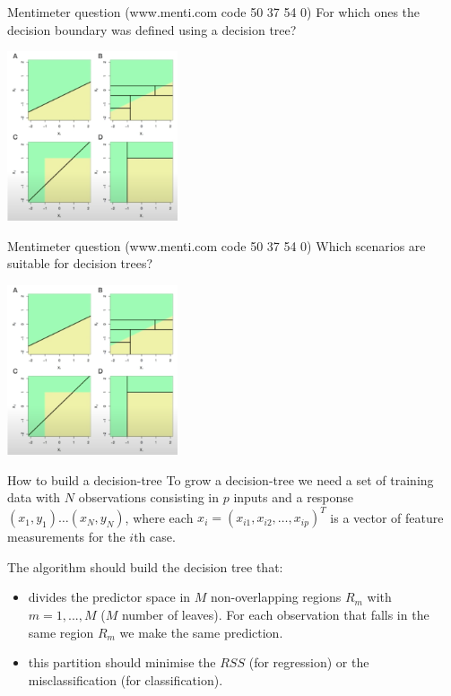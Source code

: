 \documentclass[notes]{beamer}          %
\begin{document}
\begin{frame}{Mentimeter question (www.menti.com code 50 37 54 0)}
For which ones the decision boundary was defined using a decision tree?
\begin{center}
\includegraphics[height=5cm]{../figures/week_6/Question_decision_tree}  
\end{center}
\end{frame}

\begin{frame}{Mentimeter question (www.menti.com code 50 37 54 0)}
Which scenarios are suitable for decision trees?
\begin{center}
\includegraphics[height=5cm]{../figures/week_6/Question_decision_tree}  
\end{center}
\end{frame}



\begin{frame}{How to build a decision-tree}
To grow a decision-tree we need a set of training data with $N$ observations consisting in $p$ inputs and a response
$(x_1,y_1) \dots (x_N,y_N)$, where each $x_i=(x_{i1}, x_{i2}, \dots, x_{ip})^T$ is a vector of feature measurements for the $i$th case.

\vspace{0.5cm}

The algorithm should build the decision tree that:

\begin{itemize}
\item divides the predictor space in $M$ non-overlapping regions $R_m$ with $m=1,...,M$ ($M$ number of leaves). For each observation that falls in the same region $R_m$ we make the same prediction.
\item this partition should minimise the $RSS$ (for regression) or the misclassification (for classification).
\end{itemize}
\end{frame}
\end{document}

